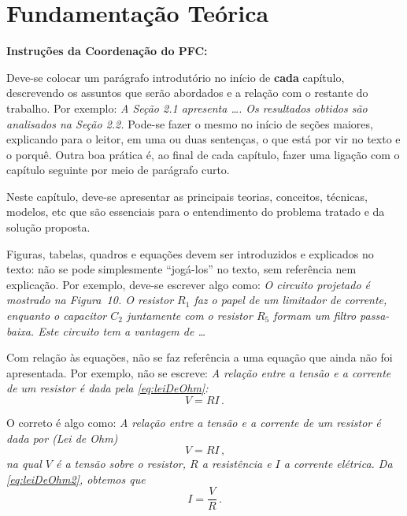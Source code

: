 \chapter{Fundamentação Teórica}\label{cap:desenvolvimento}

\textbf{Instruções da Coordenação do PFC:}

Deve-se colocar um parágrafo introdutório no início de \textbf{cada} capítulo, descrevendo os assuntos que serão abordados e a relação com o restante do trabalho. Por exemplo: \emph{A Seção 2.1 apresenta \ldots. Os resultados obtidos são analisados na Seção 2.2.} Pode-se fazer o mesmo no início de seções maiores, explicando para o leitor, em uma ou duas sentenças, o que está por vir no texto e o porquê. Outra boa prática é, ao final de cada capítulo, fazer uma ligação com o capítulo seguinte por meio de parágrafo curto.

Neste capítulo, deve-se apresentar as principais teorias, conceitos, técnicas, modelos, etc que são essenciais para o entendimento do problema tratado e da solução proposta.

Figuras, tabelas, quadros e equações devem ser introduzidos e explicados no texto: não se pode simplesmente ``jogá-los'' no texto, sem referência nem explicação. Por exemplo, deve-se escrever algo como: \emph{O circuito projetado é mostrado na Figura~10. O resistor $R_1$ faz o papel de um limitador de corrente, enquanto o capacitor $C_2$ juntamente com o resistor $R_5$ formam um filtro passa-baixa. Este circuito tem a vantagem de \ldots}

Com relação às equações, não se faz referência a uma equação que ainda não foi apresentada. Por exemplo, não se escreve: \emph{A relação entre a tensão e a corrente de um resistor é dada pela \autoref{eq:leiDeOhm}:}
\begin{equation}\label{eq:leiDeOhm}
    V = R I \, \text{.}
\end{equation}

\noindent O correto é algo como: \emph{A relação entre a tensão e a corrente de um resistor é dada por (Lei de Ohm)}
\begin{equation}\label{eq:leiDeOhm2}
    V = R I \, \text{,}
   \end{equation}
\emph{na qual $V$ é a tensão sobre o resistor, $R$ a resistência e $I$ a corrente elétrica. Da \autoref{eq:leiDeOhm2}, obtemos que}
\begin{equation}\label{eq:leiDeOhm3}
    I = \dfrac{V}{R} \, \text{.}
\end{equation}

